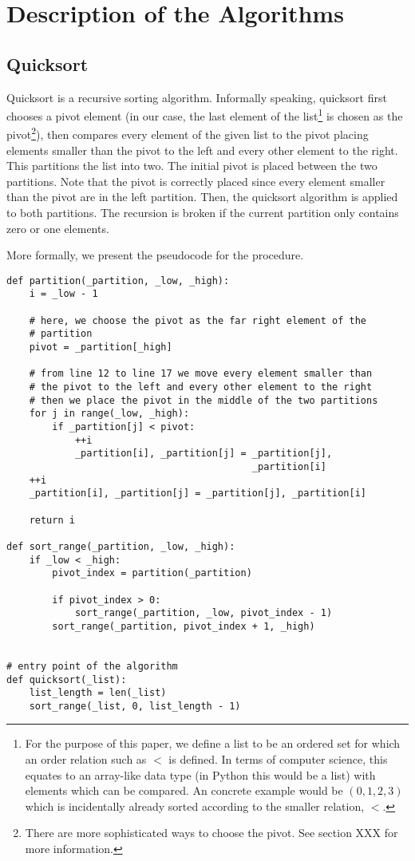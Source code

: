 \section{Description of the Algorithms}
\subsection{Quicksort}
Quicksort is a recursive sorting algorithm. Informally speaking, quicksort first chooses a pivot element (in our case, the last element of the list\footnote{For the purpose of this paper, we define a list to be an ordered set for which an order relation such as \(<\) is defined. In terms of computer science, this equates to an array-like data type (in Python this would be a list) with elements which can be compared. An concrete example would be \((0, 1, 2, 3)\) which is incidentally already sorted according to the smaller relation, \(<\).} is chosen as the pivot\footnote{There are more sophisticated ways to choose the pivot. See section XXX for more information.}), then compares every element of the given list to the pivot placing elements smaller than the pivot to the left and every other element to the right. This partitions the list into two. The initial pivot is placed between the two partitions. Note that the pivot is correctly placed since every element smaller than the pivot are in the left partition. Then, the quicksort algorithm is applied to both partitions. The recursion is broken if the current partition only contains zero or one elements.

More formally, we present the pseudocode for the procedure.

\begin{lstlisting}
def partition(_partition, _low, _high):
    i = _low - 1

    # here, we choose the pivot as the far right element of the
    # partition
    pivot = _partition[_high]

    # from line 12 to line 17 we move every element smaller than 
    # the pivot to the left and every other element to the right
    # then we place the pivot in the middle of the two partitions
    for j in range(_low, _high):
        if _partition[j] < pivot:
            ++i
            _partition[i], _partition[j] = _partition[j], 
                                           _partition[i]
    ++i
    _partition[i], _partition[j] = _partition[j], _partition[i]

    return i

def sort_range(_partition, _low, _high):
    if _low < _high:
        pivot_index = partition(_partition)

        if pivot_index > 0:
            sort_range(_partition, _low, pivot_index - 1)
        sort_range(_partition, pivot_index + 1, _high)


# entry point of the algorithm
def quicksort(_list):
    list_length = len(_list)
    sort_range(_list, 0, list_length - 1)

\end{lstlisting}